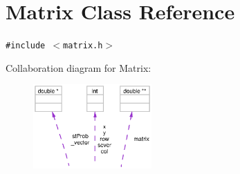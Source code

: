 \section{Matrix Class Reference}
\label{classMatrix}
{\tt \#include $<$matrix.h$>$}

Collaboration diagram for Matrix:\begin{figure}[H]
\begin{center}
\leavevmode
\includegraphics[width=128pt]{classMatrix__coll__graph}
\end{center}
\end{figure}
